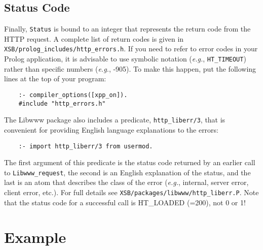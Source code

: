 \subsection{Status Code}

Finally, {\tt Status} is bound to an integer that represents the return
code from the HTTP request. A complete list of return codes is given in
{\tt XSB/prolog\_includes/http\_errors.h}. If you need to refer to error
codes in your Prolog application, it is advisable to use symbolic notation
({\it e.g.}, {\tt HT\_TIMEOUT}) rather than specific numbers ({\it e.g.},
-905). To make this happen, put the following lines at the top of your
program:
\begin{verbatim}
    :- compiler_options([xpp_on]).
    #include "http_errors.h"
\end{verbatim}
The Libwww package also includes a predicate, {\tt http\_liberr/3}, that is
convenient for providing English language explanations to the errors:
\begin{verbatim}
    :- import http_liberr/3 from usermod.  
\end{verbatim}
The first argument of this predicate is the status code returned by an
earlier call to {\tt Libwww\_request}, the second is an English explanation
of the status, and the last is an atom that describes the class of the
error ({\it e.g.}, internal, server error, client error, etc.). For full
details see {\tt XSB/packages/libwww/http\_liberr.P}. Note that the status
code for a successful call is HT\_LOADED (=200), not 0 or 1!

\section{Example}

